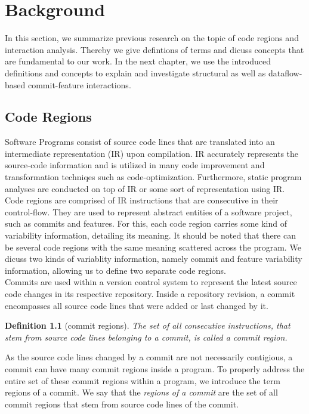 \chapter{Background}\label{ch:background}

In this section, we summarize previous research on the topic of code regions and interaction analysis.
Thereby we give defintions of terms and dicuss concepts that are fundamental to our work.
In the next chapter, we use the introduced definitions and concepts to explain and investigate structural as well as dataflow-based commit-feature interactions.

\section{Code Regions}\label{ch:code_regions}
Software Programs consist of source code lines that are translated into an intermediate representation (IR) upon compilation.
IR accurately represents the source-code information and is utilized in many code improvement and transformation techniqes such as code-optimization.
Furthermore, static program analyses are conducted on top of IR or some sort of representation using IR. \\
Code regions are comprised of IR instructions that are consecutive in their control-flow. 
They are used to represent abstract entities of a software project, such as commits and features.
For this, each code region carries some kind of variability information, detailing its meaning.
It should be noted that there can be several code regions with the same meaning scattered across the program.
We dicuss two kinds of variablity information, namely commit and feature variability information, allowing us to define two separate code regions. \\
Commits are used within a version control system to represent the latest source code changes in its respective repository.
Inside a repository revision, a commit encompasses all source code lines that were added or last changed by it. 

\newtheorem{definition}{Definition}
\begin{definition}[commit regions]\label{def:commit_regions}
	\emph{The set of all consecutive instructions, that stem from source code lines belonging to a commit, is called a} commit region.
\end{definition}

As the source code lines changed by a commit are not necessarily contigious,
a commit can have many commit regions inside a program. 
To properly address the entire set of these commit regions within a program, we introduce the term regions of a commit.
We say that the \emph{regions of a commit} are the set of all commit regions that stem from source code lines of the commit. \\

